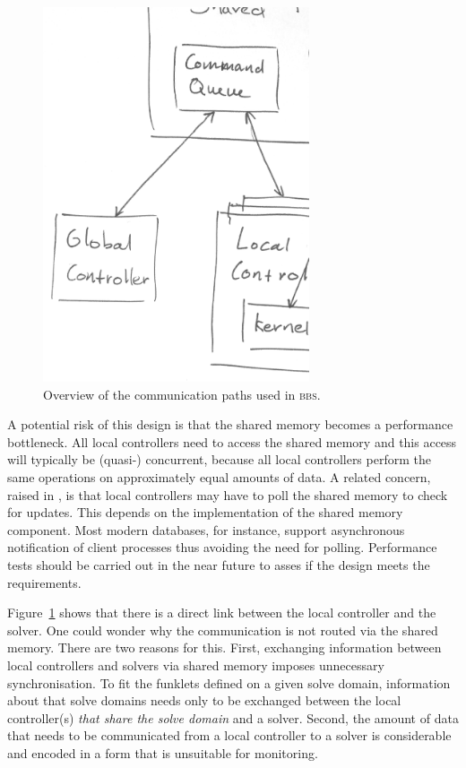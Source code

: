 \documentclass[10pt]{lofar}
\newcommand{\bbs}{\textsc{bbs}\xspace}
\begin{document}
\begin{figure}[htb!]
\centering
\includegraphics[width=0.7\textwidth]{images/communication.ps}
\caption{Overview of the communication paths used in \bbs.}
\label{fig:distribution-communication}
\end{figure}

A potential risk of this design is that the shared memory becomes a performance
bottleneck.  All local controllers need to access the shared memory and this
access will typically be (quasi-) concurrent, because all local controllers
perform the same operations on approximately equal amounts of data. A related
concern, raised in \cite[p.19]{LOFAR-ASTRON-SDD-052}, is that local controllers
may have to poll the shared memory to check for updates. This depends on the
implementation of the shared memory component. Most modern databases, for
instance, support asynchronous notification of client processes thus avoiding
the need for polling. Performance tests should be carried out in the near future
to asses if the design meets the requirements.

Figure~\ref{fig:distribution-communication} shows that there is a direct link
between the local controller and the solver. One could wonder why the
communication is not routed via the shared memory. There are two reasons for
this. First, exchanging information between local controllers and solvers via
shared memory imposes unnecessary synchronisation. To fit the funklets defined
on a given solve domain, information about that solve domains needs only to be
exchanged between the local controller(s) \emph{that share the solve domain} and
a solver. Second, the amount of data that needs to be communicated from a local
controller to a solver is considerable and encoded in a form that is unsuitable
for monitoring.
\end{document}
